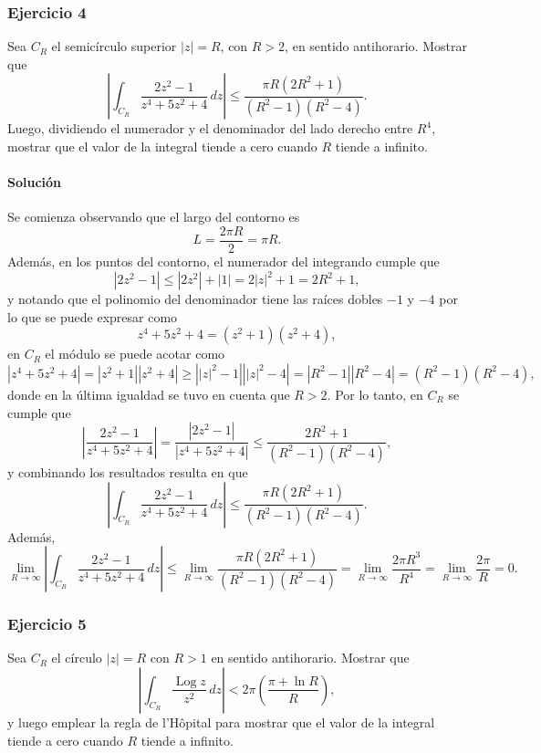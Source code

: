 \documentclass[a4paper]{report}
\DeclareMathOperator{\Log}{Log}
\begin{document}
\subsubsection{Ejercicio 4}

Sea \(C_R\) el semicírculo superior \(|z|=R\), con \(R>2\), en sentido antihorario. Mostrar que 
\[
 \left|\int_{C_R}\frac{2z^2-1}{z^4+5z^2+4}\,dz\right|\leq\frac{\pi R(2R^2+1)}{(R^2-1)(R^2-4)}.
\]
Luego, dividiendo el numerador y el denominador del lado derecho entre \(R^4\), mostrar que el valor de la integral tiende a cero cuando \(R\) tiende a infinito.

\paragraph{Solución} Se comienza observando que el largo del contorno es
\[
 L=\frac{2\pi R}{2}=\pi R.
\]
Además, en los puntos del contorno, el numerador del integrando cumple que 
\[
 |2z^2-1|\leq|2z^2|+|1|=2|z|^2+1=2R^2+1,
\]
y notando que el polinomio del denominador tiene las raíces dobles \(-1\) y \(-4\) por lo que se puede expresar como
\[
 z^4+5z^2+4=(z^2+1)(z^2+4),
\]
en \(C_R\) el módulo se puede acotar como
\[
 |z^4+5z^2+4|=|z^2+1||z^2+4|\geq\left||z|^2-1\right|\left||z|^2-4\right|=|R^2-1||R^2-4|=(R^2-1)(R^2-4),
\]
donde en la última igualdad se tuvo en cuenta que \(R>2\). Por lo tanto, en \(C_R\) se cumple que 
\[
 \left|\frac{2z^2-1}{z^4+5z^2+4}\right|=\frac{|2z^2-1|}{|z^4+5z^2+4|}\leq\frac{2R^2+1}{(R^2-1)(R^2-4)},
\]
y combinando los resultados resulta en que
\[
 \left|\int_{C_R}\frac{2z^2-1}{z^4+5z^2+4}\,dz\right|\leq\frac{\pi R(2R^2+1)}{(R^2-1)(R^2-4)}.
\]
Además, 
\[
 \lim_{R\to\infty}\left|\int_{C_R}\frac{2z^2-1}{z^4+5z^2+4}\,dz\right|\leq\lim_{R\to\infty}\frac{\pi R(2R^2+1)}{(R^2-1)(R^2-4)}=\lim_{R\to\infty}\frac{2\pi R^3}{R^4}=\lim_{R\to\infty}\frac{2\pi}{R}=0.
\]

\subsubsection{Ejercicio 5}

Sea \(C_R\) el círculo \(|z|=R\) con \(R>1\) en sentido antihorario. Mostrar que 
\[
 \left|\int_{C_R}\frac{\Log z}{z^2}\,dz\right|<2\pi\left(\frac{\pi+\ln R}{R}\right),
\]
y luego emplear la regla de l'Hôpital para mostrar que el valor de la integral tiende a cero cuando \(R\) tiende a infinito.
\end{document}
